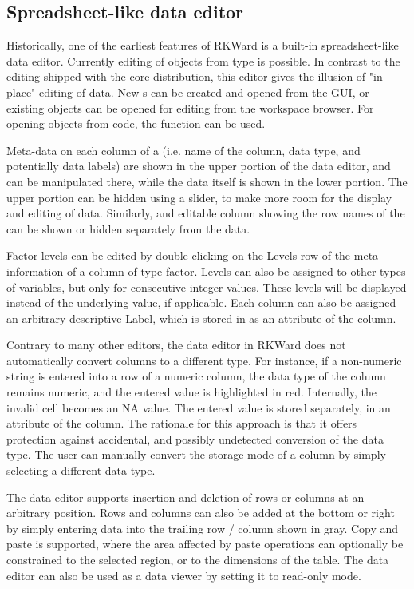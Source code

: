 \subsection{Spreadsheet-like data editor}
\label{sec:spreadsheet}

Historically, one of the earliest
features of RKWard is a built-in spreadsheet-like data editor.
Currently editing of  objects from type
 is possible. In contrast to the  editing shipped
with the  core distribution, this editor
gives the illusion of "in-place" editing of data. New s can
be created and opened from the GUI, or existing objects can be opened
for editing from the workspace browser. For opening objects from
 code, the function
 can be used.

Meta-data on each column of a  (i.e. name of the column, data
type, and potentially data labels) are shown in the upper portion of
the data editor, and can be manipulated there, while the data itself is
shown in the lower portion. The upper portion can be hidden using a
slider, to make more room for the display and editing of data.
Similarly, and editable column showing the row names of the 
can be shown or hidden separately from the data.

Factor levels can be edited by double-clicking on the
Levels row of the meta information of a
column of type factor. Levels can also be assigned to other types of
variables, but only for consecutive integer values. These levels will
be displayed instead of the underlying value, if applicable. Each
column can also be assigned an arbitrary descriptive
Label, which is stored in
 as an attribute of the column.

Contrary to many other editors, the data editor in RKWard does not
automatically convert columns to a different type. For instance, if a
non-numeric string is entered into a row of a numeric column, the data
type of the column remains numeric, and the entered value is
highlighted in red. Internally, the invalid cell becomes an NA value.
The entered value is stored separately, in an attribute of the column.
The rationale for this approach is that it offers protection against
accidental, and possibly undetected conversion of the data type. The
user can manually convert the storage mode of a column by simply
selecting a different data type.

The data editor supports insertion and deletion of rows or columns at an
arbitrary position. Rows and columns can also be added at the bottom or
right by simply entering data into the trailing row / column shown in
gray. Copy and paste is supported, where the area affected by paste
operations can optionally be constrained to the selected region, or to
the dimensions of the table. The data editor can also be used as a data
viewer by setting it to read-only mode.

